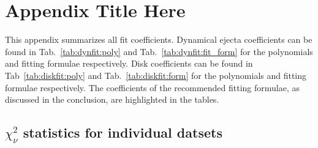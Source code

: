 
\chapter{Appendix Title Here} %

\label{app:fit} %

This appendix summarizes all fit coefficients.
Dynamical ejecta coefficients can be found in 
Tab.~\ref{tab:dynfit:poly} and 
Tab.~\ref{tab:dynfit:fit_form} for the polynomials and fitting
formulae respectively.
Disk coefficients can be found in 
Tab~\ref{tab:diskfit:poly} and 
Tab.~\ref{tab:diskfit:form} for the polynomials and fitting
formulae respectively.
The coefficients of the recommended fitting formulae, as discussed in
the conclusion, are highlighted in the tables.

  



\section{$\chi_\nu^2$ statistics for individual datsets}
\label{app:datasets}

